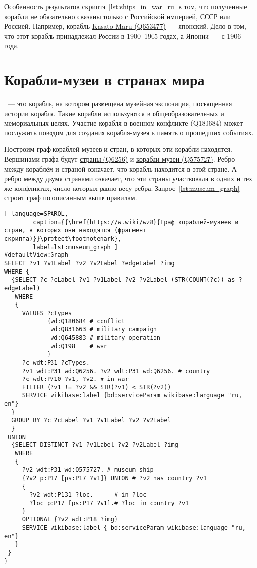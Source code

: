 Особенность результатов скрипта~\ref{lst:ships_in_war_ru} в том, 
что полученные корабли не обязательно связаны только с Российской империей, 
СССР или Россией. 
Например, корабль \href{https://www.wikidata.org/wiki/Q653477}{Kasato Maru (Q653477)}~--- японский. 
Дело в том, что этот корабль принадлежал России в 1900--1905 годах, а Японии~--- с 1906 года.



\section{Корабли-музеи в странах мира}

~--- это корабль, на котором размещена музейная экспозиция, посвященная истории корабля. Такие корабли используются в общеобразовательных и мемориальных целях. Участие корабля в \href{https://www.wikidata.org/wiki/Q180684}{военном конфликте (Q180684)} может послужить поводом для создания корабля-музея в память о прошедших событиях. 

Построим граф кораблей-музеев и стран, в которых эти корабли находятся. 
Вершинами графа будут \href{https://www.wikidata.org/wiki/Q6256}{страны (Q6256)} и 
\href{https://www.wikidata.org/wiki/Q575727}{корабли-музеи (Q575727)}. 
Ребро между кораблём и страной означает, что корабль находится в этой стране. 
А ребро между двумя странами означает, 
что эти страны участвовали в одних и тех же конфликтах, число которых равно весу ребра. 
Запрос~\ref{lst:museum_graph} строит граф по описанным выше правилам.

\begin{lstlisting}[ language=SPARQL, 
        caption={{\href{https://w.wiki/wz8}{Граф кораблей-музеев и стран, в которых они находятся (фрагмент скрипта)}}\protect\footnotemark}, 
        label=lst:museum_graph ]
#defaultView:Graph    
SELECT ?v1 ?v1Label ?v2 ?v2Label ?edgeLabel ?img 
WHERE {
  {SELECT ?c ?cLabel ?v1 ?v1Label ?v2 ?v2Label (STR(COUNT(?c)) as ?edgeLabel) 
   WHERE
   {
     VALUES ?cTypes 
            {wd:Q180684 # conflict
             wd:Q831663 # military campaign
             wd:Q645883 # military operation
             wd:Q198    # war
            } 
     ?c wdt:P31 ?cTypes.
     ?v1 wdt:P31 wd:Q6256. ?v2 wdt:P31 wd:Q6256. # country
     ?c wdt:P710 ?v1, ?v2. # in war
     FILTER (?v1 != ?v2 && STR(?v1) < STR(?v2)) 
     SERVICE wikibase:label {bd:serviceParam wikibase:language "ru, en"}
  }
  GROUP BY ?c ?cLabel ?v1 ?v1Label ?v2 ?v2Label
  }
 UNION
  {SELECT DISTINCT ?v1 ?v1Label ?v2 ?v2Label ?img
   WHERE
   {
     ?v2 wdt:P31 wd:Q575727. # museum ship
     {?v2 p:P17 [ps:P17 ?v1]} UNION # ?v2 has country ?v1
     {
       ?v2 wdt:P131 ?loc.      # in ?loc
       ?loc p:P17 [ps:P17 ?v1].# ?loc in country ?v1
     } 
     OPTIONAL {?v2 wdt:P18 ?img}
     SERVICE wikibase:label { bd:serviceParam wikibase:language "ru, en"}
   }
 }
}
\end{lstlisting}


